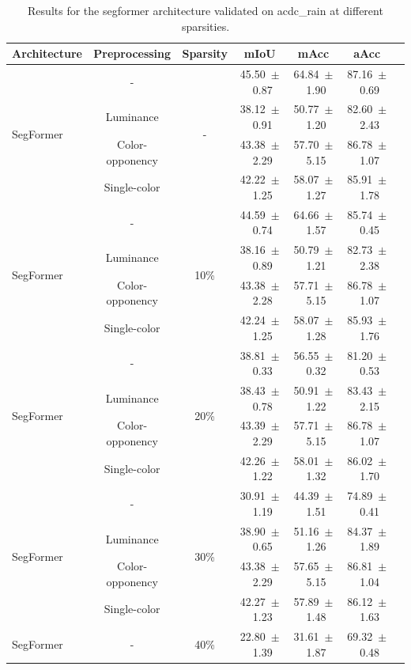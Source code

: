 \begin{table}[h]
\centering
\caption{Results for the segformer architecture validated on acdc_rain at different sparsities.}
\begin{tabular}{@{}lccc ccc@{}}
\toprule
Architecture & Preprocessing & Sparsity & mIoU & mAcc & aAcc \\
\midrule

\multirow{4}{*}{SegFormer} & - & \multirow{4}{*}{-} & 45.50~$\pm$~0.87 & 64.84~$\pm$~1.90 & 87.16~$\pm$~0.69 \\
& Luminance & & 38.12~$\pm$~0.91 & 50.77~$\pm$~1.20 & 82.60~$\pm$~2.43 \\
& Color-opponency & & 43.38~$\pm$~2.29 & 57.70~$\pm$~5.15 & 86.78~$\pm$~1.07 \\
& Single-color & & 42.22~$\pm$~1.25 & 58.07~$\pm$~1.27 & 85.91~$\pm$~1.78 \\
\midrule
\multirow{4}{*}{SegFormer} & - & \multirow{4}{*}{10\%} & 44.59~$\pm$~0.74 & 64.66~$\pm$~1.57 & 85.74~$\pm$~0.45 \\
& Luminance & & 38.16~$\pm$~0.89 & 50.79~$\pm$~1.21 & 82.73~$\pm$~2.38 \\
& Color-opponency & & 43.38~$\pm$~2.28 & 57.71~$\pm$~5.15 & 86.78~$\pm$~1.07 \\
& Single-color & & 42.24~$\pm$~1.25 & 58.07~$\pm$~1.28 & 85.93~$\pm$~1.76 \\
\midrule
\multirow{4}{*}{SegFormer} & - & \multirow{4}{*}{20\%} & 38.81~$\pm$~0.33 & 56.55~$\pm$~0.32 & 81.20~$\pm$~0.53 \\
& Luminance & & 38.43~$\pm$~0.78 & 50.91~$\pm$~1.22 & 83.43~$\pm$~2.15 \\
& Color-opponency & & 43.39~$\pm$~2.29 & 57.71~$\pm$~5.15 & 86.78~$\pm$~1.07 \\
& Single-color & & 42.26~$\pm$~1.22 & 58.01~$\pm$~1.32 & 86.02~$\pm$~1.70 \\
\midrule
\multirow{4}{*}{SegFormer} & - & \multirow{4}{*}{30\%} & 30.91~$\pm$~1.19 & 44.39~$\pm$~1.51 & 74.89~$\pm$~0.41 \\
& Luminance & & 38.90~$\pm$~0.65 & 51.16~$\pm$~1.26 & 84.37~$\pm$~1.89 \\
& Color-opponency & & 43.38~$\pm$~2.29 & 57.65~$\pm$~5.15 & 86.81~$\pm$~1.04 \\
& Single-color & & 42.27~$\pm$~1.23 & 57.89~$\pm$~1.48 & 86.12~$\pm$~1.63 \\
\midrule
\multirow{4}{*}{SegFormer} & - & \multirow{4}{*}{40\%} & 22.80~$\pm$~1.39 & 31.61~$\pm$~1.87 & 69.32~$\pm$~0.48 \\

\end{tabular}
\end{table}
